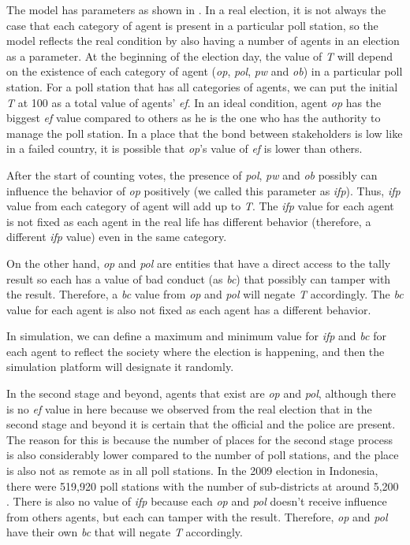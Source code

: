 \documentclass[JIP]{ipsj}
\begin{document}
The model has parameters as shown in . In a real election, it is not always the case that each category of agent is present in a particular poll station, so the model reflects the real condition by also having a number of agents in an election as a parameter. At the beginning of the election day, the value of \textit{T} will depend on the existence of each category of agent (\textit{op}, \textit{pol}, \textit{pw} and \textit{ob}) in a particular poll station. For a poll station that has all categories of agents, we can put the initial \textit{T} at 100 as a total value of agents' \textit{ef}. In an ideal condition, agent \textit{op} has the biggest \textit{ef} value compared to others as he is the one who has the authority to manage the poll station. In a place that the bond between stakeholders is low like in a failed country, it is possible that \textit{op}'s value of \textit{ef} is lower than others.

After the start of counting votes, the presence of \textit{pol}, \textit{pw} and \textit{ob} possibly can influence the behavior of \textit{op} positively (we called this parameter as \textit{ifp}). Thus, \textit{ifp} value from each category of agent will add up to \textit{T}. The \textit{ifp} value for each agent is not fixed as each agent in the real life has different behavior (therefore, a different \textit{ifp} value) even in the same category. 

On the other hand, \textit{op} and \textit{pol} are entities that have a direct access to the tally result so each has a value of bad conduct (as \textit{bc}) that possibly can tamper with the result. Therefore, a \textit{bc} value from \textit{op} and \textit{pol} will negate \textit{T} accordingly. The \textit{bc} value for each agent is also not fixed as each agent has a different behavior.

In simulation, we can define a maximum and minimum value for \textit{ifp} and \textit{bc} for each agent to reflect the society where the election is happening, and then the simulation platform will designate it randomly.

In the second stage and beyond, agents that exist are \textit{op} and \textit{pol}, although there is no \textit{ef} value in here because we observed from the real election that in the second stage and beyond it is certain that the official and the police are present. The reason for this is because the number of places for the second stage process is also considerably lower compared to the number of poll stations, and the place is also not as remote as in all poll stations. In the 2009 election in Indonesia, there were 519,920 poll stations with the number of sub-districts at around 5,200 \cite{KPU200903}\cite{PemiluIndonesia20090313}. There is also no value of \textit{ifp} because each \textit{op} and \textit{pol} doesn't receive influence from others agents, but each can tamper with the result. Therefore, \textit{op} and \textit{pol} have their own \textit{bc} that will negate \textit{T} accordingly.
\end{document}
